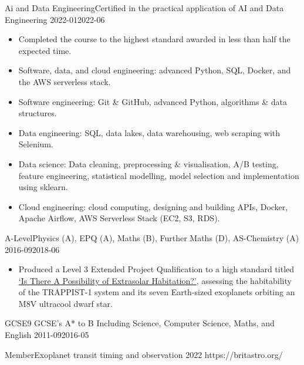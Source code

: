 {Ai and Data Engineering}{Certified in the practical application of AI and Data Engineering}
{2022-01}{2022-06}
{%
\begin{itemize}[leftmargin=*, labelsep=-0.1em, noitemsep]
    \item Completed the course to the highest standard awarded in less than half the expected time.
\iflean
    \item Software, data, and cloud engineering: advanced Python, SQL, Docker, and the AWS serverless stack.
\else
    \item Software engineering: Git \& GitHub, advanced Python, algorithms \& data structures.
    \item Data engineering: SQL, data lakes, data warehousing, web scraping with Selenium.
    \item Data science: Data cleaning, preprocessing \& visualisation, A/B testing, feature engineering, statistical modelling, model selection and implementation using sklearn.
    \item Cloud engineering: cloud computing, designing and building APIs, Docker, Apache Airflow, AWS Serverless Stack (EC2, S3, RDS).
\fi
\end{itemize}
}

\iflean\else
{}
{A-Level}{Physics (A), EPQ (A), Maths (B), Further Maths (D), AS-Chemistry (A)}
{2016-09}{2018-06}
{%
\begin{itemize}[leftmargin=*, labelsep=-0.1em, noitemsep]
    \item Produced a Level 3 Extended Project Qualification to a high standard titled \href{https://skyecas.github.io/assets/pdf/EPQ.pdf}{`Is There A Possibility of Extrasolar Habitation?'}, assessing the habitability of the TRAPPIST-1 system and its seven Earth-sized exoplanets orbiting an M8V ultracool dwarf star.
\end{itemize}
}

{GCSE}{9 GCSE's A* to B Including Science, Computer Science, Maths, and English}
{2011-09}{2016-05}
{}
\fi


\iflean\else
{}
{Member}{Exoplanet transit timing and observation}
{2022}{}
{}
{https://britastro.org/}
\fi


